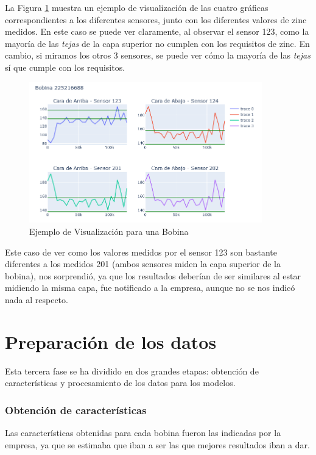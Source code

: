 La Figura \ref{f:visu} muestra un ejemplo de visualización de las cuatro gráficas correspondientes a los diferentes sensores, junto con los diferentes valores de zinc medidos. En este caso se puede ver claramente, al observar el sensor 123, como la mayoría de las \emph{tejas} de la capa superior no cumplen con los requisitos de zinc. En cambio, si miramos los otros 3 sensores, se puede ver cómo la mayoría de las \emph{tejas} sí que cumple con los requisitos. 

\begin{figure}[h]
 \centering
  \includegraphics[width=0.9\textwidth]{img/visuaBobi.PNG}
 \caption{Ejemplo de Visualización para una Bobina}
 \label{f:visu}
\end{figure}

Este caso de ver como los valores medidos por el sensor 123 son bastante diferentes a los medidos 201 (ambos sensores miden la capa superior de la bobina), nos sorprendió, ya que los resultados deberían de ser similares al estar midiendo la misma capa, fue notificado a la empresa, aunque no se nos indicó nada al respecto.

\section{Preparación de los datos}
Esta tercera fase se ha dividido en dos grandes etapas: obtención de características y procesamiento de los datos para los modelos.

\subsubsection{Obtención de características}
Las características obtenidas para cada bobina fueron las indicadas por la empresa, ya que se estimaba que iban a ser las que mejores resultados iban a dar. 

